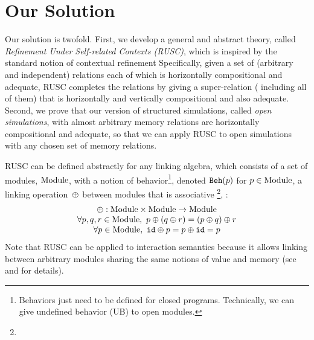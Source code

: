 \section{Our Solution}
\label{sec:overview-verification:solution}

%
Our solution is twofold. First, we develop a general and abstract
theory, called \emph{Refinement Under Self-related Contexts (RUSC)},
which is inspired by the standard notion of contextual refinement
Specifically, given a set of (arbitrary and independent)
relations each of which is horizontally compositional and adequate,
RUSC completes the relations by giving a super-relation (\ie
including all of them) that is horizontally and vertically
compositional and also adequate. Second, we prove that
our version of structured simulations, called \emph{open simulations},
with almost arbitrary memory relations
are horizontally compositional and adequate,
so that we can apply RUSC to open simulations with any chosen set of memory relations.

%
RUSC can be defined abstractly for any linking algebra, which consists
of a set of modules, $\textrm{Module}$, with a notion of behavior\footnote{Behaviors just need to be defined for closed programs.
  Technically, we can give undefined behavior (UB) to open modules.
}, denoted
$\mathtt{Beh}({p})$ for $p\in\textrm{Module}$, a linking operation~$\oplus$ between modules
that is associative%
\footnote{},
:
\[
\begin{array}{c}
\oplus: \textrm{Module} \times \textrm{Module} \rightarrow \textrm{Module} \\
\forall p,q,r\in\textrm{Module},~p \oplus (q \oplus r) = (p \oplus q) \oplus r \\
\forall p \in\textrm{Module},~ \texttt{id} \oplus p = p \oplus \texttt{id} = p \\
\end{array}
\]
Note that RUSC can be applied to interaction semantics because it
allows linking between arbitrary modules sharing the same notions
of value and memory (see  and  for details).

